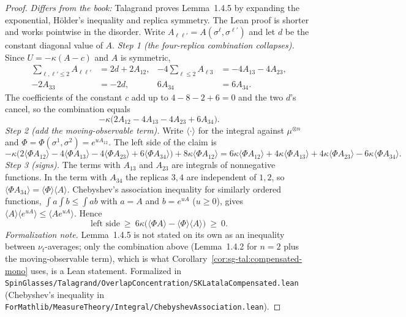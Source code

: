 \begin{proof}
\leanok
\emph{Differs from the book:} Talagrand proves Lemma~1.4.5 by expanding the exponential, H\"older's inequality and replica symmetry. The Lean proof is shorter and works pointwise in the disorder. Write $A_{\ell\ell'}=A(\sigma^\ell,\sigma^{\ell'})$ and let $d$ be the constant diagonal value of $A$.
\emph{Step 1 (the four-replica combination collapses).} Since $U=-\kappa(A-c)$ and $A$ is symmetric,
\begin{align*}
\sum_{\ell,\ell'\le2}A_{\ell\ell'}&=2d+2A_{12}, & -4\sum_{\ell\le2}A_{\ell3}&=-4A_{13}-4A_{23},\\
-2A_{33}&=-2d, & 6A_{34}&=6A_{34}.
\end{align*}
The coefficients of the constant $c$ add up to $4-8-2+6=0$ and the two $d$'s cancel, so the combination equals
\[
-\kappa\big(2A_{12}-4A_{13}-4A_{23}+6A_{34}\big).
\]
\emph{Step 2 (add the moving-observable term).} Write $\langle\cdot\rangle$ for the integral against $\mu^{\otimes n}$ and $\Phi=\Phi(\sigma^1,\sigma^2)=e^{uA_{12}}$. The left side of the claim is
\[
-\kappa\big(2\langle\Phi A_{12}\rangle-4\langle\Phi A_{13}\rangle-4\langle\Phi A_{23}\rangle+6\langle\Phi A_{34}\rangle\big)+8\kappa\langle\Phi A_{12}\rangle
=6\kappa\langle\Phi A_{12}\rangle+4\kappa\langle\Phi A_{13}\rangle+4\kappa\langle\Phi A_{23}\rangle-6\kappa\langle\Phi A_{34}\rangle .
\]
\emph{Step 3 (signs).} The terms with $A_{13}$ and $A_{23}$ are integrals of nonnegative functions. In the term with $A_{34}$ the replicas $3,4$ are independent of $1,2$, so $\langle\Phi A_{34}\rangle=\langle\Phi\rangle\langle A\rangle$. Chebyshev's association inequality for similarly ordered functions, $\int a\int b\le\int ab$ with $a=A$ and $b=e^{uA}$ ($u\ge0$), gives $\langle A\rangle\langle e^{uA}\rangle\le\langle Ae^{uA}\rangle$. Hence
\[
\text{left side}\ \ge\ 6\kappa\big(\langle\Phi A\rangle-\langle\Phi\rangle\langle A\rangle\big)\ \ge\ 0 .
\]
\emph{Formalization note.} Lemma~1.4.5 is not stated on its own as an inequality between $\nu_t$-averages; only the combination above (Lemma~1.4.2 for $n=2$ plus the moving-observable term), which is what Corollary~\ref{cor:sg-tal:compensated-mono} uses, is a Lean statement.
Formalized in \texttt{SpinGlasses/Talagrand/OverlapConcentration/SKLatalaCompensated.lean} (Chebyshev's inequality in \texttt{ForMathlib/MeasureTheory/Integral/ChebyshevAssociation.lean}).
\end{proof}

